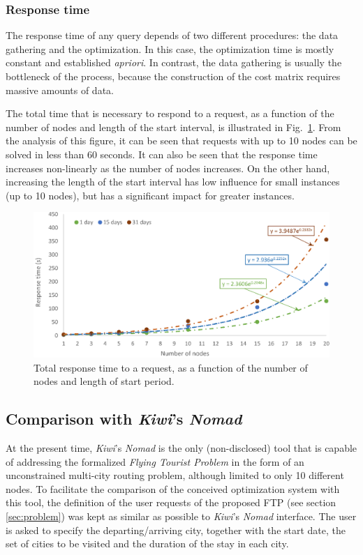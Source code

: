 \documentclass[onecolumn]{elsarticle}
\begin{document}
\subsubsection{Response time}

The response time of any query depends of two different procedures: the data gathering and the optimization. In this case, the optimization time is mostly constant and established \textit{apriori}. In contrast, the data gathering is usually the bottleneck of the process, because the construction of the cost matrix requires massive amounts of data. 

The total time that is necessary to respond to a request, as a function of the number of nodes and length of the start interval, is illustrated in Fig.~\ref{fig:response_time}. From the analysis of this figure, it can be seen that requests with up to 10 nodes can be solved in less than 60 seconds. It can also be seen that the response time increases non-linearly as the number of nodes increases. On the other hand, increasing the length of the start interval has low influence for small instances (up to 10 nodes), but has a significant impact for greater instances.

\begin{figure}
  \centering
  \includegraphics[width=1.0\columnwidth]{fig5.eps}
  \caption{Total response time to a request, as a function of the number of nodes and length of start period.}
  \label{fig:response_time}  
\end{figure}


\subsection{Comparison with \textit{Kiwi}'s \textit{Nomad}}

At the present time, \textit{Kiwi}'s \textit{Nomad} is the only (non-disclosed) tool that is capable of addressing the formalized \textit{Flying Tourist Problem} in the form of an unconstrained multi-city routing problem, although limited to only 10 different nodes. To facilitate the comparison of the conceived optimization system with this tool, the definition of the user requests of the proposed FTP (see section \ref{sec:problem}) was kept as similar as possible to \textit{Kiwi}'s \textit{Nomad} interface. The user is asked to specify the departing/arriving city, together with the start date, the set of cities to be visited and the duration of the stay in each city.
\end{document}

